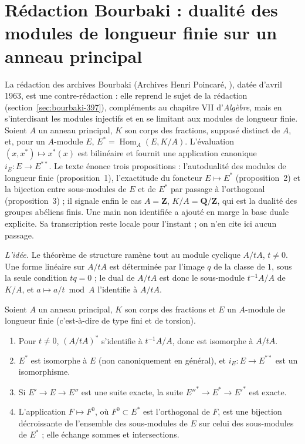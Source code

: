 \section[Rédaction Bourbaki \redac{398} : dualité des modules de longueur finie]{Rédaction Bourbaki  : dualité des modules de longueur finie sur un anneau principal\protect{}}\label{sec:bourbaki-398}

La rédaction  des archives Bourbaki (Archives Henri Poincaré, ), datée d'avril 1963, est une contre-rédaction : elle reprend le sujet de la rédaction  (section~\ref{sec:bourbaki-397}), compléments au chapitre VII d'\emph{Algèbre}, mais en s'interdisant les modules injectifs et en se limitant aux modules de longueur finie. Soient $A$ un anneau principal, $K$ son corps des fractions, supposé distinct de $A$, et, pour un $A$-module $E$, $E^{*} = \operatorname{Hom}_A(E, K/A)$. L'évaluation $(x, x^{*}) \mapsto x^{*}(x)$ est bilinéaire et fournit une application canonique $i_E \colon E \to E^{**}$. Le texte énonce trois propositions : l'autodualité des modules de longueur finie (proposition~1), l'exactitude du foncteur $E \mapsto E^{*}$ (proposition~2) et la bijection entre sous-modules de $E$ et de $E^{*}$ par passage à l'orthogonal (proposition~3) ; il signale enfin le cas $A = \mathbf Z$, $K/A = \mathbf Q/\mathbf Z$, qui est la dualité des groupes abéliens finis. Une main non identifiée a ajouté en marge la base duale explicite. Sa transcription reste locale pour l'instant ; on n'en cite ici aucun passage.

\emph{L'idée.} Le théorème de structure ramène tout au module cyclique $A/tA$, $t \neq 0$. Une forme linéaire sur $A/tA$ est déterminée par l'image $q$ de la classe de $1$, sous la seule condition $tq = 0$ ; le dual de $A/tA$ est donc le sous-module $t^{-1}A/A$ de $K/A$, et $a \mapsto a/t \bmod A$ l'identifie à $A/tA$.

\begin{encadre}
\begin{enonce}
Soient $A$ un anneau principal, $K$ son corps des fractions et $E$ un $A$-module de longueur finie (c'est-à-dire de type fini et de torsion).
\begin{enumerate}
\item[a)] Pour $t \neq 0$, $(A/tA)^{*}$ s'identifie à $t^{-1}A/A$, donc est isomorphe à $A/tA$.
\item[b)] $E^{*}$ est isomorphe à $E$ (non canoniquement en général), et $i_E \colon E \to E^{**}$ est un isomorphisme.
\item[c)] Si $E' \to E \to E''$ est une suite exacte, la suite $E''^{*} \to E^{*} \to E'^{*}$ est exacte.
\item[d)] L'application $F \mapsto F^{0}$, où $F^{0} \subset E^{*}$ est l'orthogonal de $F$, est une bijection décroissante de l'ensemble des sous-modules de $E$ sur celui des sous-modules de $E^{*}$ ; elle échange sommes et intersections.
\end{enumerate}
\end{enonce}
\end{encadre}

